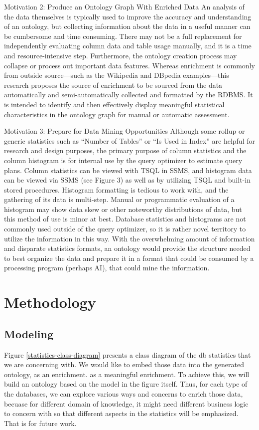 \documentclass[sigconf]{acmart}
\begin{document}
Motivation 2: Produce an Ontology Graph With Enriched Data
An analysis of the data themselves is typically used to improve the accuracy and
understanding of an ontology, but collecting information about the data in a useful manner can be
cumbersome and time consuming. There may not be a full replacement for independently evaluating column data and table usage manually, and it is a time and resource-intensive step.
Furthermore, the ontology creation process may collapse or process out important data features.
Whereas enrichment is commonly from outside source—such as the Wikipedia \cite{tramontana2022ontology} and DBpedia \cite{booshehri2015ontology} examples—this research proposes the
source of enrichment to be sourced from the data automatically and semi-automatically collected
and formatted by the RDBMS. It is intended to identify and then effectively display meaningful
statistical characteristics in the ontology graph for manual or automatic assessment. 

Motivation 3: Prepare for Data Mining Opportunities
Although some rollup or generic statistics such as “Number of Tables” or “Is Used in
Index” are helpful for research and design purposes, the primary purpose of column statistics and
the column histogram is for internal use by the query optimizer to estimate query plans. Column
statistics can be viewed with TSQL in SSMS, and histogram data can be viewed via SSMS (see
Figure 3) as well as by utilizing TSQL and built-in stored procedures. Histogram formatting is
tedious to work with, and the gathering of its data is multi-step. Manual or programmatic
evaluation of a histogram may show data skew or other noteworthy distributions of data, but this
method of use is minor at best. Database statistics and histograms are not commonly used outside
of the query optimizer, so it is rather novel territory to utilize the information in this way. With
the overwhelming amount of information and disparate statistics formats, an ontology would
provide the structure needed to best organize the data and prepare it in a format that could be
consumed by a processing program (perhaps AI), that could mine the information. 


\section{Methodology}

\subsection{Modeling}
Figure \ref{statistics-class-diagram} presents a class diagram of the db statistics that we are concerning with. We would like to embed those data into the generated ontology, as an enrichment. as a meaningful enrichment. To achieve this, we will build an ontology based on the model in the figure itself. Thus, for each type of the databases, we can explore various ways and concerns to enrich those data, becuase for different domain of knowledge, it might need different business logic to concern with so that different aspects in the statistics will be emphasized. That is for future work.
\end{document}

